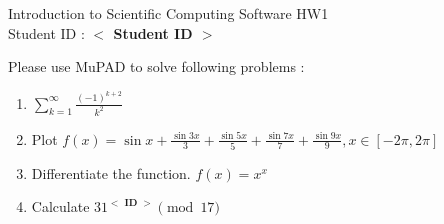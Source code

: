 \documentclass[12pt,a4paper]{article}
\newcommand{\placeholder}[1]{\textbf{$<$ #1 $>$}}
\newcommand{\idnumber}{\placeholder{Student ID}}
\newcommand{\moodleid}{\placeholder{ID}}
\begin{document}
\begin{flushleft}Introduction to Scientific Computing Software HW1
\\Student ID : \idnumber{}\end{flushleft}

Please use MuPAD to solve following problems : 
\begin{enumerate}
\item 
$\displaystyle{\sum^\infty_{k=1}\frac{(-1)^{k+2}}{k^2}}$

\item Plot
$\displaystyle{f(x)=\sin x+\frac{\sin 3x}{3}+\frac{\sin5x}{5}+\frac{\sin7x}{7}+\frac{\sin9x}{9}},x\in[-2\pi,2\pi]$

\item Differentiate the function. $f(x)=x^x$

\item Calculate $31^{\moodleid}\pmod{17}$

\end{enumerate}
\end{document}

